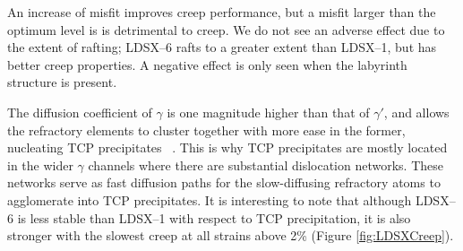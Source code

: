 An increase of misfit improves creep performance, but a misfit larger than the optimum level is is detrimental to creep. We do not see an adverse effect due to the extent of rafting; LDSX--6 rafts to a greater extent than LDSX--1, but has better creep properties.  A negative effect is only seen when the labyrinth structure is present. 

The diffusion coefficient of $\gamma$ is one magnitude higher than that of $\gamma'$, and allows the refractory elements to cluster together with more ease in the former, nucleating TCP precipitates ~\cite{reed06}.  This is why TCP precipitates are mostly located in the wider $\gamma$ channels where there are substantial dislocation networks.  These networks serve as fast diffusion paths for the slow-diffusing refractory atoms to agglomerate into TCP precipitates.  It is interesting to note that although LDSX--6 is less stable than LDSX--1 with respect to TCP precipitation, it is also stronger with the slowest creep at all strains above 2\% (Figure \ref{fig:LDSXCreep}).   


